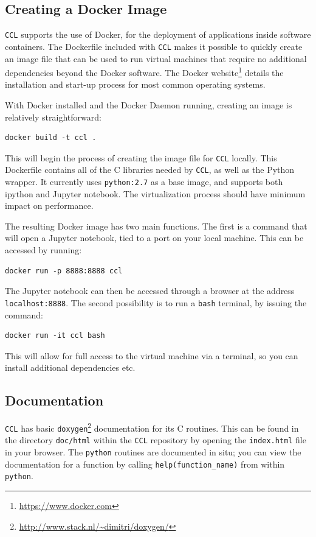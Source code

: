 \documentclass[\docopts]{\docclass}
\newcommand{\ccl}{{\tt CCL}\xspace}
\begin{document}
\subsection{Creating a Docker Image}
\ccl supports the use of Docker, for the deployment of applications inside software containers. The Dockerfile included with \ccl makes it possible to quickly create an image file that can be used to run virtual machines that require no additional dependencies beyond the Docker software. The Docker website\footnote{\url{https://www.docker.com}} details the installation and start-up process for most common operating systems.

With Docker installed and the Docker Daemon running, creating an image is relatively straightforward:
\begin{verbatim}
docker build -t ccl .
\end{verbatim}
This will begin the process of creating the image file for \ccl locally. This Dockerfile contains all of the C libraries needed by \ccl, as well as the Python wrapper. It currently uses {\tt python:2.7} as a base image, and supports both ipython and Jupyter notebook. The virtualization process should have minimum impact on performance.

The resulting Docker image has two main functions. The first is a command that will open a Jupyter notebook, tied to a port on your local machine. This can be accessed by running:
\begin{verbatim}
docker run -p 8888:8888 ccl
\end{verbatim}
The Jupyter notebook can then be accessed through a browser at the address {\tt localhost:8888}. The second possibility is to run a {\tt bash} terminal, by issuing the command:
\begin{verbatim}
docker run -it ccl bash
\end{verbatim}
This will allow for full access to the virtual machine via a terminal, so you can install additional dependencies etc.

\subsection{Documentation}
\label{sec:doc}

\ccl has basic {\tt doxygen}\footnote{\url{http://www.stack.nl/~dimitri/doxygen/}} documentation for its C routines. This can be found in the directory {\tt doc/html} within the \ccl repository by opening the {\tt index.html} file in your browser. The {\tt python} routines are documented in situ; you can view the documentation for a function by calling {\tt help(function\_name)} from within {\tt python}.
\end{document}
